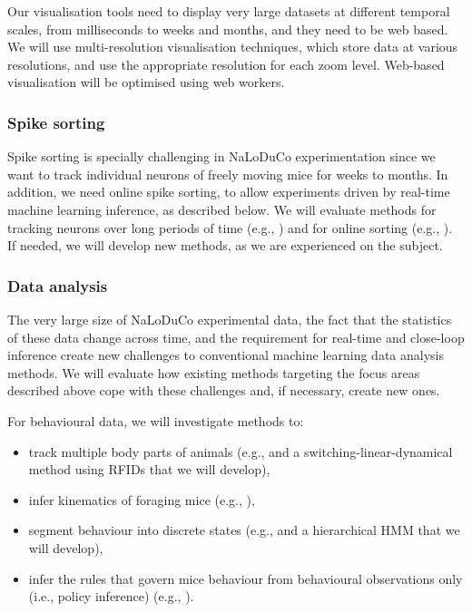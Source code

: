 Our visualisation tools need to display very large datasets at different
temporal scales, from milliseconds to weeks and months, and they need to be web
based.
%
We will use multi-resolution visualisation techniques, which store data at
various resolutions, and use the appropriate resolution for each zoom level.
%
Web-based visualisation will be optimised using web workers.

\subsubsection{Spike sorting}

Spike sorting is specially challenging in NaLoDuCo experimentation since we
want to track individual neurons of freely moving mice for weeks to months.
%
In addition, we need online spike sorting, to allow experiments driven
by real-time machine learning inference, as described below.
%
We will evaluate methods for tracking neurons over long periods of time
(e.g., \cite{yuanEtAl24}) and for online sorting
(e.g., \cite{rutishauserEtAl06}). If needed, we will develop
new methods, as we are experienced on the subject.

\subsubsection{Data analysis}

The very large size of NaLoDuCo experimental data, the fact that the statistics
of these data change across time, and the requirement for real-time and
close-loop inference create new challenges to conventional machine learning
data analysis methods.
%
We will evaluate how existing methods targeting the focus areas described above
cope with these challenges and, if necessary, create new ones.

For behavioural data, we will investigate methods to:

\begin{itemize}

    \item track multiple body parts of animals (e.g., \cite{mathisEtAl18} and a
        switching-linear-dynamical method using RFIDs that we will develop),

    \item infer kinematics of foraging mice (e.g.,
        \cite{ldspython,challaEtAl11}),

    \item segment behaviour into discrete states (e.g., \cite{wiltschkoEtAl15}
        and a hierarchical HMM that we will develop),

    \item infer the rules that govern mice behaviour from behavioural
        observations only (i.e., policy inference) (e.g., \cite{zhuEtAl23}).

\end{itemize}

